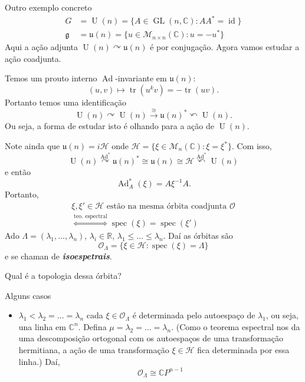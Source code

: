 \begin{idea6}{Outro exemplo concreto}\leavevmode
	\begin{align*}
		G&=\operatorname{U}(n) =\{A\in\operatorname{GL}(n,\mathbb{C}):A A^*=\operatorname{id}\} \\
		\mathfrak{g} &=\mathfrak{u}(n)=\{u\in\mathcal{M}_{n\times n}(\mathbb{C}):u=-u^*\}
	\end{align*}
	Aqui a ação adjunta $\operatorname{U}(n) \curvearrowright \mathfrak{u}(n)$ é por conjugação. Agora vamos estudar a ação coadjunta.

	Temos um prouto interno $\operatorname{Ad}$-invariante em $\mathfrak{u}(n)$:
	\[(u,v)\longmapsto \operatorname{tr}(u^kv)=-\operatorname{tr}(uv).\]
	Portanto temos uma identificação 
	\[\operatorname{U}(n) \curvearrowright \operatorname{U}(n) \xrightarrow{\cong }\mathfrak{u}(n)^*\curvearrowleft \operatorname{U}(n).\]
	Ou seja, a forma de estudar isto é olhando para a ação de $\operatorname{U}(n)$.

	Note ainda que $\mathfrak{u}(n) =i\mathcal{H}$ onde $\mathcal{H}=\{\xi \in\mathcal{M}_{n}(\mathbb{C}):\xi=\xi^*\}$. Com isso,
	\[\operatorname{U}(n) \overset{\operatorname{Ad}^*}{\curvearrowright}\mathfrak{u}(n)^*\cong \mathfrak{u}(n) \cong \mathcal{H}\overset{\operatorname{Ad}^*}{\curvearrowleft}\operatorname{U}(n)\]
	e então 
	\[\operatorname{Ad}_A^*(\xi)=A\xi^{-1}A.\]
	Portanto,
	\begin{align*}\xi,\xi'\in\mathcal{H}\text{ estão na mesma órbita coadjunta }\mathcal{O}\\
		\overset{\text{teo. espectral} }{\iff}  \operatorname{sp ec}(\xi)=\operatorname{s pec}(\xi')
		\end{align*}
		Ado $\Lambda=(\lambda_1,\ldots,\lambda_n)$, $\lambda_i\in\mathbb{R}$, $\lambda_1\leq \ldots \leq \lambda_n$. Daí as órbitas são
		\[\mathcal{O}_\Lambda=\{\xi \in\mathcal{H}:\operatorname{s pec}(\xi)=\Lambda\}\]
		e se chaman de \textit{\textbf{isoespetrais}}.

	{\color{5}Qual é a topologia dessa órbita?}
\begin{idea3}{Alguns casos}\leavevmode
	\begin{itemize}
	\item $\lambda_1<\lambda_2=\ldots =\lambda_n$ cada $\xi\in\mathcal{O}_\Lambda$ é determinada pelo autoespaço de $\lambda_1$, ou seja, una linha em $\mathbb{C}^{n}$. Defina $\mu=\lambda_2=\ldots =\lambda_n$. (Como o teorema espectral nos da uma descomposição ortogonal com os autoespaços de uma transformação hermitiana, a ação de uma transformação $\xi \in\mathcal{H}$ fica determinada por essa linha.) Daí,
		\[\mathcal{O}_\Lambda\cong \mathbb{C}P^{n-1}\]


\end{itemize}
\end{idea3}
\end{idea6}
